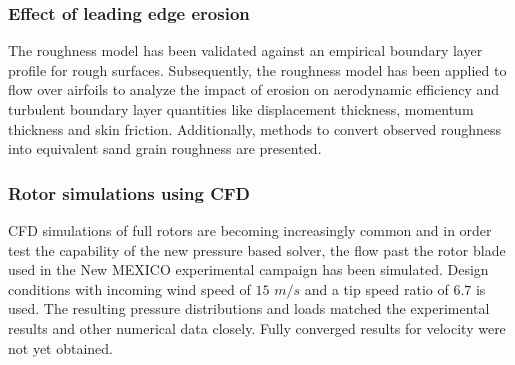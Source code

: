 \subsubsection*{Effect of leading edge erosion}
The roughness model has been validated against an empirical boundary layer profile for rough surfaces. Subsequently, the roughness model has been applied to flow over airfoils to analyze the impact of erosion on aerodynamic efficiency and turbulent boundary layer quantities like displacement thickness, momentum thickness and skin friction. Additionally, methods to convert observed roughness into equivalent sand grain roughness are presented.

\subsubsection*{Rotor simulations using CFD}
CFD simulations of full rotors are becoming increasingly common and in order test the capability of the new pressure based solver, the flow past the rotor blade used in the New MEXICO experimental campaign has been simulated. Design conditions with incoming wind speed of $15$ $m/s$ and a tip speed ratio of $6.7$ is used. The resulting pressure distributions and loads matched the experimental results and other numerical data closely. Fully converged results for velocity were not yet obtained.



